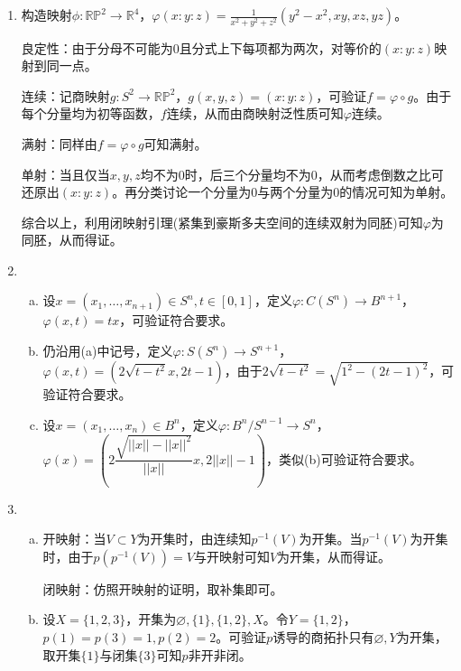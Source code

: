 \documentclass[a4paper,UTF8,fontset=windows]{ctexart}
\begin{document}
\subsection{}
\begin{enumerate}[(1)]
    \item
    构造映射$\phi:\mathbb{R}\mathbb{P}^2\to\mathbb{R}^4$，$\varphi(x:y:z)=\frac{1}{x^2+y^2+z^2}(y^2-x^2,xy,xz,yz)$。
    
    良定性：由于分母不可能为0且分式上下每项都为两次，对等价的$(x:y:z)$映射到同一点。
    
    连续：记商映射$g:S^2\to\mathbb{R}\mathbb{P}^2$，$g(x,y,z)=(x:y:z)$，可验证$f=\varphi\circ g$。由于每个分量均为初等函数，$f$连续，从而由商映射泛性质可知$\varphi$连续。
    
    满射：同样由$f=\varphi\circ g$可知满射。
    
    单射：当且仅当$x,y,z$均不为0时，后三个分量均不为0，从而考虑倒数之比可还原出$(x:y:z)$。再分类讨论一个分量为0与两个分量为0的情况可知为单射。
    
    综合以上，利用闭映射引理(紧集到豪斯多夫空间的连续双射为同胚)可知$\varphi$为同胚，从而得证。
    
    \item
    \begin{enumerate}[(a)]
    \item
    设$x=(x_1,\dots,x_{n+1})\in S^n,t\in[0,1]$，定义$\varphi:C(S^n)\to B^{n+1}$，$\varphi(x,t)=tx$，可验证符合要求。
    
    \item
    仍沿用(a)中记号，定义$\varphi:S(S^n)\to S^{n+1}$，$\varphi(x,t)=(2\sqrt{t-t^2}x,2t-1)$，由于$2\sqrt{t-t^2}=\sqrt{1^2-(2t-1)^2}$，可验证符合要求。
    
    \item
    设$x=(x_1,\dots,x_n)\in B^n$，定义$\varphi:B^n/S^{n-1}\to S^n$，$\varphi(x)=\left(2\dfrac{\sqrt{||x||-||x||^2}}{||x||}x,2||x||-1\right)$，类似(b)可验证符合要求。
    \end{enumerate}
    
    \item
    \begin{enumerate}[(a)]
    \item
    开映射：当$V\subset Y$为开集时，由连续知$p^{-1}(V)$为开集。当$p^{-1}(V)$为开集时，由于$p(p^{-1}(V))=V$与开映射可知$V$为开集，从而得证。
    
    闭映射：仿照开映射的证明，取补集即可。
    
    \item
    设$X=\{1,2,3\}$，开集为$\varnothing,\{1\},\{1,2\},X$。令$Y=\{1,2\}$，$p(1)=p(3)=1,p(2)=2$。可验证$p$诱导的商拓扑只有$\varnothing,Y$为开集，取开集$\{1\}$与闭集$\{3\}$可知$p$非开非闭。
    

\end{enumerate}
\end{enumerate}
\end{document}

